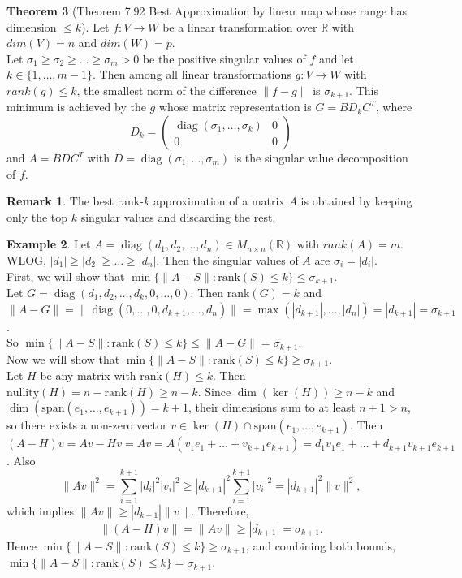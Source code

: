 \documentclass[letterpaper, 11pt]{article}
\newcommand{\R}{\mathbb{R}}   %
\newcommand{\1}{\mathds{1}}		%
\DeclareMathOperator*{\diag}{diag}        %
\theoremstyle{definition}
\newtheorem{theorem}{Theorem}[section]
\newtheorem{example}[theorem]{Example}
\newtheorem{remark}[theorem]{Remark}
\begin{document}
\newpage
\begin{theorem}[Theorem 7.92 Best Approximation by linear map whose range has dimension $ \leq k$]
  Let $f : V \to W$ be a linear transformation over $\R$ with $dim(V) = n$ and $dim(W) = p$. \\
  Let $\sigma_1 \geq \sigma_2 \geq \ldots \geq \sigma_m > 0$ be the positive singular values of $f$ and let $k \in \{1, \ldots, m - 1\}$. Then among all linear transformations $g : V \to W$ with $rank(g) \leq k$, the smallest norm of the difference $\| f - g \|$ is $\sigma_{k + 1}$. This minimum is achieved by the $g$ whose matrix representation is $G = B D_k C^T$, where
  \[
    D_k = \begin{pmatrix} \diag(\sigma_1, \ldots, \sigma_k) & 0 \\ 0 & 0 \end{pmatrix}
  \]
  and $A = B D C^T$ with $D = \diag(\sigma_1, \ldots, \sigma_m)$ is the singular value decomposition of $f$.

  \begin{remark}
    The best rank-$k$ approximation of a matrix $A$ is obtained by keeping only the top $k$ singular values and discarding the rest.
  \end{remark}
  
  \begin{example}
    Let $A = \diag(d_1, d_2, \ldots, d_n) \in M_{n \times n}(\R)$ with $rank(A) = m$.\\
    WLOG, $|d_1| \geq |d_2| \geq \ldots \geq |d_n|$. Then the singular values of $A$ are $\sigma_i = |d_i|$.\\
    First, we will show that $\min\{\| A - S \| : \text{rank}(S) \leq k\} \leq \sigma_{k + 1}$.\\
    Let $G = \diag(d_1, d_2, \ldots, d_k, 0, \ldots, 0)$. Then $\text{rank}(G) = k$ and $\| A - G \| = \| \diag(0, \ldots, 0, d_{k + 1}, \ldots, d_n) \| = \max(|d_{k + 1}|, \ldots, |d_n|) = |d_{k + 1}| = \sigma_{k + 1}$.\\
    So $\min \{\| A - S \| : \text{rank}(S) \leq k\} \leq \| A - G \| = \sigma_{k + 1}$.\\
    Now we will show that $\min\{\| A - S \| : \text{rank}(S) \leq k\} \geq \sigma_{k + 1}$.\\
    Let $H$ be any matrix with $\text{rank}(H) \leq k$. Then $\text{nullity}(H) = n - \text{rank}(H) \geq n - k$. Since $\dim(\ker(H)) \geq n - k$ and $\dim(\text{span}(e_1, \ldots, e_{k + 1})) = k + 1$, their dimensions sum to at least $n + 1 > n$, so there exists a non-zero vector $v \in \ker(H) \cap \text{span}(e_1, \ldots, e_{k + 1})$. Then $(A - H)v = Av - Hv = Av = A(v_1 e_1 + \ldots + v_{k + 1} e_{k + 1}) = d_1 v_1 e_1 + \ldots + d_{k+1} v_{k+1} e_{k+1}$. Also
    \[
      \| Av \|^2 = \sum_{i=1}^{k + 1} |d_i|^2 |v_i|^2 \geq |d_{k + 1}|^2 \sum_{i=1}^{k + 1} |v_i|^2 = |d_{k + 1}|^2 \| v \|^2,
    \]
    which implies $\| Av \| \geq |d_{k + 1}| \| v \|$. Therefore,
    \[
      \| (A - H)v \| = \| Av \| \geq |d_{k + 1}| = \sigma_{k + 1}.
    \]
    Hence $\min\{\| A - S \| : \text{rank}(S) \leq k\} \geq \sigma_{k + 1}$, and combining both bounds, $\min\{\| A - S \| : \text{rank}(S) \leq k\} = \sigma_{k + 1}$.
  \end{example}
\end{theorem}
\end{document}
